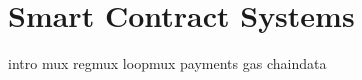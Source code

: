 \section{Smart Contract Systems}
\label{app:scs}

{intro}
{mux}
{regmux}
{loopmux}
{payments}
{gas}
{chaindata}

